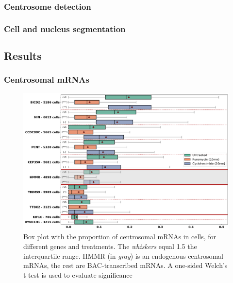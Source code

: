 \subsubsection{Centrosome detection}

\subsubsection{Cell and nucleus segmentation}

\subsection{Results}
\label{subsec:results_centrosomal}

\subsubsection{Centrosomal mRNAs}

\begin{figure}[h]
    \centering
    \includegraphics[width=\textwidth]{figures/chapter5/plot_rna_centrosome}
    \caption{Box plot with the proportion of centrosomal mRNAs in cells, for different genes and treatments.
	The \textit{whiskers} equal 1.5 the interquartile range.
	HMMR (in \textit{gray}) is an endogenous centrosomal mRNAs, the rest are BAC-transcribed mRNAs.
	A one-sided Welch’s t test is used to evaluate significance}
    \label{fig:plot_rna_centrosome}
\end{figure}


